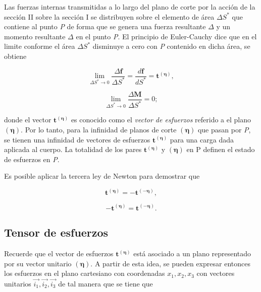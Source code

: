 \documentclass{article}
\begin{document}
    Las fuerzas internas transmitidas a lo largo del plano de corte por la acción de
    la sección II sobre la sección I se distribuyen sobre el elemento de área
    $\Delta S^{*}$ que contiene al punto \textit{P} de forma que se genera una fuerza 
    resultante $\Delta$ y un momento resultante $\Delta$ en el punto 
    \textit{P}. El principio de Euler-Cauchy dice que en el limite conforme el área
    $\Delta S^{*}$ disminuye a cero con \textit{P} contenido en dicha área, se obtiene

    \begin{equation}
        \lim_{\Delta S^{*} \to 0} \frac{\Delta \bm{f}}{\Delta S^{*}} =
        \frac{d \bm{f}}{dS^{*}} =
        \bm{t^{\bm{(\eta)}}},
    \end{equation}

    \begin{equation}
        \lim_{\Delta S^{*} \to 0} \frac{\Delta \bm{M}}{\Delta S^{*}} = 0;
    \end{equation}

    donde el vector $\bm{t^{\bm{(\eta)}}}$ es conocido como el \textit{vector de esfuerzos}
    referido a el plano $\bm{(\eta)}$.
    Por lo tanto, para la infinidad de planos de corte $\bm{(\eta)}$ que pasan por \textit{P},
    se tienen una infinidad de vectores de esfuerzos $\bm{t^{\bm{(\eta)}}}$ para una carga
    dada aplicada al cuerpo. La totalidad de los pares $\bm{t^{\bm{(\eta)}}}$ y $\bm{(\eta)}$
    en P definen el estado de esfuerzos en \textit{P}.

    Es posible aplicar la tercera ley de Newton para demostrar que

    \begin{equation}
        \bm{t^{\bm{(\eta)}}} = - \bm{t^{\bm{(-\eta)}}},
    \end{equation}

    \begin{equation}
        -\bm{t^{\bm{(\eta)}}} = \bm{t^{\bm{(-\eta)}}}.
    \end{equation}

    \subsection{Tensor de esfuerzos}

    Recuerde que el vector de esfuerzos $\bm{t^{\bm{(\eta)}}}$ est\'{a} asociado a un plano 
    representado por su vector unitario $\bm{(\eta)}$. A partir de esta idea, se pueden
    expresar entonces los esfuerzos en el plano cartesiano con coordenadas $x_{1}, x_{2}, x_{3}$ 
    con vectores unitarios $\vec{i_{1}}, \vec{i_{2}}, \vec{i_{3}}$ de tal manera que se tiene que
\end{document}
